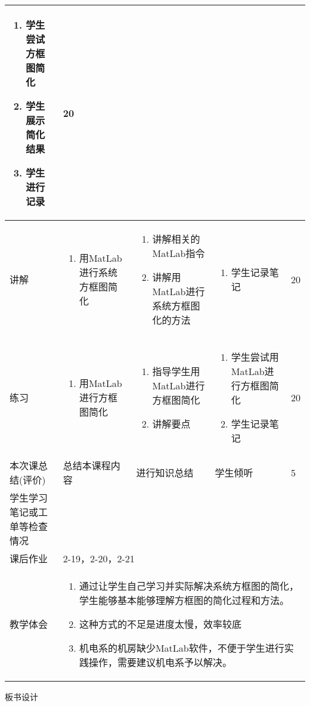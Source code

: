 {\begin{landscape}
\begin{longtable}{|m{10mm}|m{50mm}|m{50mm}|m{50mm}|m{15mm}|}
\begin{enumerate}
\item 学生尝试方框图简化
\item 学生展示简化结果
\item 学生进行记录
\end{enumerate} &20 \\\hline
讲解&\begin{enumerate}
\item 用MatLab进行系统方框图简化
\end{enumerate}
 &\begin{enumerate}
\item 讲解相关的MatLab指令
\item 讲解用MatLab进行系统方框图化的方法
\end{enumerate} &\begin{enumerate}
\item 学生记录笔记
\end{enumerate} &20 \\\hline
练习&
\begin{enumerate}
\item 用MatLab进行方框图简化
\end{enumerate}
 &\begin{enumerate}
\item 指导学生用MatLab进行方框图简化
\item 讲解要点
\end{enumerate} &\begin{enumerate}
\item 学生尝试用MatLab进行方框图简化
\item 学生记录笔记
\end{enumerate} &20 \\\hline
\centering 本次课总结(评价)&总结本课程内容 &进行知识总结 &学生倾听 &5 \\\hline
\centering 学生学习笔记或工单等检查情况&\multicolumn{4}{m{165mm}|}{\quad}\\\hline
\centering 课后作业&\multicolumn{4}{m{165mm}|}{2-19，2-20，2-21}\\\hline
\centering 教学体会&\multicolumn{4}{m{165mm}|}{\begin{enumerate}
\item 通过让学生自己学习并实际解决系统方框图的简化，学生能够基本能够理解方框图的简化过程和方法。
\item 这种方式的不足是进度太慢，效率较底
\item 机电系的机房缺少MatLab软件，不便于学生进行实践操作，需要建议机电系予以解决。
\end{enumerate}}
\end{longtable}

\end{landscape}
\clearpage
\begin{center}
{\huge 板书设计}
\end{center}
}
